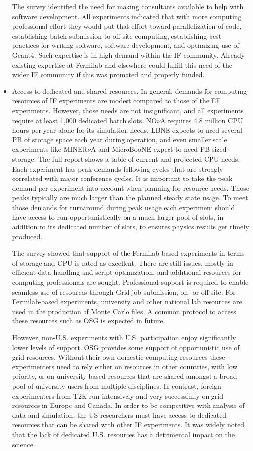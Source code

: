 \begin{itemize}
The survey identified the need for making consultants available to help with
software development. All experiments indicated that with more computing
professional effort they would put that effort toward parallelization of code,
establishing batch submission to off-site computing, establishing best
practices for writing software, software development, and  optimizing use of
Geant4. Such expertise is in high demand within the IF community. Already
existing expertise at Fermilab and elsewhere could fulfill this need of the
wider IF community if this was promoted and properly funded.

\item Access to dedicated and shared resources.  In general, demands for
computing resources of IF experiments are modest compared to those of the EF
experiments.  However, those needs are not insignificant, and all experiments
require at least 1,000 dedicated batch slots.  NO$\nu$A requires 4.8 million
CPU hours per year alone for its simulation needs, LBNE expects to need
several PB of storage space each year during operation, and even smaller scale
experiments like MINER$\nu$A and MicroBooNE expect to need PB-sized storage.
The full report shows a table of current and projected CPU needs. Each
experiment has peak demands following cycles that are strongly correlated with
major conference cycles.  It is important to take the peak demand per
experiment into account when planning for resource needs. Those peaks
typically are much larger than the planned steady state usage. To meet those
demands for turnaround during peak usage each experiment should have access to
run opportunistically on a much larger pool of slots, in addition to its
dedicated number of slots, to ensures physics results get timely produced.

The survey showed that support of the Fermilab based experiments in terms of
storage and CPU is rated as excellent.  There are still issues, mostly in
efficient data handling and script optimization, and additional resources for
computing professionals are sought.  Professional support is required to
enable seamless use of resources through Grid job submission, on- or off-site.
For Fermilab-based experiments, university and other national lab resources
are used in the production of Monte Carlo files. A common protocol to access
these resources such as OSG is expected in future.

However, non-U.S. experiments with U.S. participation enjoy significantly
lower levels of support. OSG provides some support of opportunistic use of
grid resources.  Without their own domestic computing resources these
experimenters need to rely either on resources in other countries, with low
priority, or on university based resources that are shared amongst a broad
pool of university users from multiple disciplines. In contrast, foreign experimenters
from T2K run intensively and very successfully on grid resources in Europe and
Canada.  In order to be competitive with analysis of data and simulation, the US 
researchers must have access to dedicated resources that can
be shared with other IF experiments. It was widely noted that the lack of dedicated U.S.
resources has a detrimental impact on the science.


\end{itemize}
